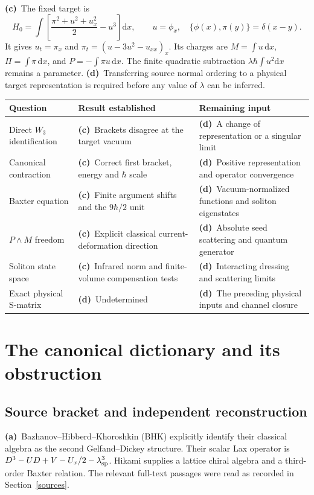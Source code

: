 \documentclass[11pt,a4paper]{article}
\newcommand{\A}{\textbf{(a)}\ }
\newcommand{\C}{\textbf{(c)}\ }
\newcommand{\D}{\textbf{(d)}\ }
\newcommand{\dd}{\mathrm d}
\begin{document}
\C The fixed target is
\begin{equation}
 H_0=\int\left[\frac{\pi^2+u^2+u_x^2}{2}-u^3\right]\dd x,\qquad
 u=\phi_x,\quad \{\phi(x),\pi(y)\}=\delta(x-y).
 \label{target}
\end{equation}
It gives $u_t=\pi_x$ and
$\pi_t=(u-3u^2-u_{xx})_x$. Its charges are
$M=\int u\,\dd x$, $\Pi=\int\pi\,\dd x$, and
$P=-\int\pi u\,\dd x$. The finite quadratic subtraction
$\lambda\hbar\int u^2\dd x$ remains a parameter.
\D Transferring source normal ordering to a physical target representation
is required before any value of $\lambda$ can be inferred.

\begin{center}
\small
\begin{tabular}{@{}L{4.0cm}L{5.7cm}L{5.3cm}@{}}
\toprule
Question & Result established & Remaining input\\
\midrule
Direct $W_3$ identification & \C Brackets disagree at the target vacuum &
\D A change of representation or a singular limit\\
Canonical contraction & \C Correct first bracket, energy and $\hbar$ scale &
\D Positive representation and operator convergence\\
Baxter equation & \C Finite argument shifts and the $9\hbar/2$ unit &
\D Vacuum-normalized functions and soliton eigenstates\\
$P\wedge M$ freedom & \C Explicit classical current-deformation direction &
\D Absolute seed scattering and quantum generator\\
Soliton state space & \C Infrared norm and finite-volume compensation tests &
\D Interacting dressing and scattering limits\\
Exact physical S-matrix & \D Undetermined &
\D The preceding physical inputs and channel closure\\
\bottomrule
\end{tabular}
\end{center}

\section{The canonical dictionary and its obstruction}
\subsection{Source bracket and independent reconstruction}
\A Bazhanov--Hibberd--Khoroshkin (BHK) explicitly identify their classical
algebra as the second Gelfand--Dickey structure. Their scalar Lax operator
is $D^3-UD+V-U_x/2-\lambda_{\rm sp}^3$.
Hikami supplies a lattice chiral algebra and a third-order Baxter relation.
The relevant full-text passages were read as recorded in
Section~\ref{sources}. \cite{BHK,Hikami}
\end{document}
